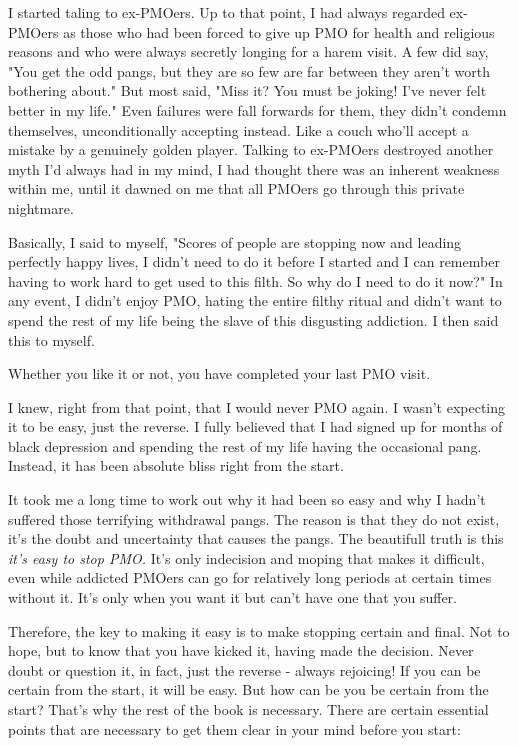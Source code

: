 \documentclass[easypeasy]{subfiles}
\begin{document}
I started taling to ex-PMOers. Up to that point, I had always regarded ex-PMOers as those who had been forced to give up PMO for health and religious reasons and who were always secretly longing for a harem visit. A few did say, "You get the odd pangs, but they are so few are far between they aren't worth bothering about." But most said, "Miss it? You must be joking! I've never felt better in my life." Even failures were fall forwards for them, they didn't condemn themselves, unconditionally accepting instead. Like a couch who'll accept a mistake by a genuinely golden player. Talking to ex-PMOers destroyed another myth I'd always had in my mind, I had thought there was an inherent weakness within me, until it dawned on me that all PMOers go through this private nightmare.

Basically, I said to myself, "Scores of people are stopping now and leading perfectly happy lives, I didn't need to do it before I started and I can remember having to work hard to get used to this filth. So why do I need to do it now?" In any event, I didn't enjoy PMO, hating the entire filthy ritual and didn't want to spend the rest of my life being the slave of this disgusting addiction. I then said this to myself.

  {\huge Whether you like it or not, you have completed your last PMO visit.}

I knew, right from that point, that I would never PMO again. I wasn't expecting it to be easy, just the reverse. I fully believed that I had signed up for months of black depression and spending the rest of my life having the occasional pang. Instead, it has been absolute bliss right from the start.

It took me a long time to work out why it had been so easy and why I hadn't suffered those terrifying withdrawal pangs. The reason is that they do not exist, it's the doubt and uncertainty that causes the pangs. The beautifull truth is this \textit{it's easy to stop PMO.} It's only indecision and moping that makes it difficult, even while addicted PMOers can go for relatively long periods at certain times without it. It's only when you want it but can't have one that you suffer.

Therefore, the key to making it easy is to make stopping certain and final. Not to hope, but to know that you have kicked it, having made the decision. Never doubt or question it, in fact, just the reverse - always rejoicing! If you can be certain from the start, it will be easy. But how can be you be certain from the start? That's why the rest of the book is necessary. There are certain essential points that are necessary to get them clear in your mind before you start:
\end{document}
